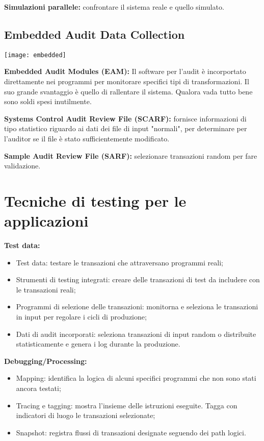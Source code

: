 \textbf{Simulazioni parallele:} confrontare il sistema reale e quello simulato.

\subsection{Embedded Audit Data Collection}

        \begin{center}
                \texttt{[image: embedded]}
        		\label{fig:testing:facilities:parallel}
        \end{center}
        

\textbf{Embedded Audit Modules (EAM):} Il software per l'audit è incorportato direttamente 
nei programmi per monitorare specifici tipi di transformazioni. Il suo grande svantaggio è 
quello di rallentare il sistema. Qualora vada tutto bene sono soldi spesi inutilmente.

\textbf{Systems Control Audit Review File (SCARF):} fornisce informazioni di tipo statistico 
riguardo ai dati dei file di input "normali", per determinare per l'auditor se il file è 
stato sufficientemente modificato.

\textbf{Sample Audit Review File (SARF):} selezionare transazioni random per fare validazione.

\section{Tecniche di testing per le applicazioni}

\textbf{Test data:}
\begin{itemize}
    \item Test data: testare le transazioni che attraversano programmi reali;
    \item Strumenti di testing integrati: creare delle transazioni di test da includere con 
    le transazioni reali;
    \item Programmi di selezione delle transazioni: monitorna e seleziona le transazioni in input 
    per regolare i cicli di produzione;
    \item Dati di audit incorporati: seleziona transazioni di input random o distribuite statisticamente 
    e genera i log durante la produzione.
\end{itemize}

\textbf{Debugging/Processing:}

\begin{itemize}
    \item Mapping: identifica la logica di alcuni specifici programmi che non sono stati ancora testati;
    \item Tracing e tagging: mostra l'insieme delle istruzioni eseguite. Tagga con indicatori di luogo le 
    transazioni selezionate;
    \item Snapshot: registra flussi di transazioni designate seguendo dei path logici.
\end{itemize}

